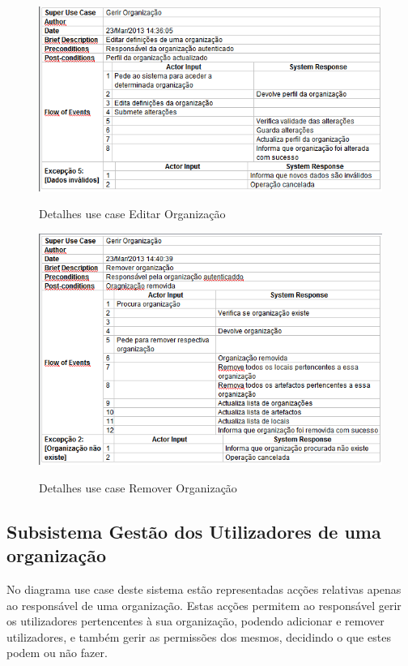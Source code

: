 ﻿\documentclass[12pt,a4paper]{article}
\begin{document}
\begin{figure}[h!]
\centering
\includegraphics[scale=0.7]{d_usecase/editarorganizacao}
\label{usecase}
\caption{Detalhes use case Editar Organização}
\end{figure}

\begin{figure}[h!]
\centering
\includegraphics[scale=0.7]{d_usecase/removerorganizacao}
\label{usecase}
\caption{Detalhes use case Remover Organização}
\end{figure}

\clearpage

\subsection{Subsistema Gestão dos Utilizadores de uma organização}
No diagrama use case deste sistema estão representadas acções relativas apenas ao responsável de uma organização. Estas acções permitem ao responsável gerir os utilizadores pertencentes à sua organização, podendo adicionar e remover utilizadores, e também gerir as permissões dos mesmos, decidindo o que estes podem ou não fazer.\\
\end{document}
